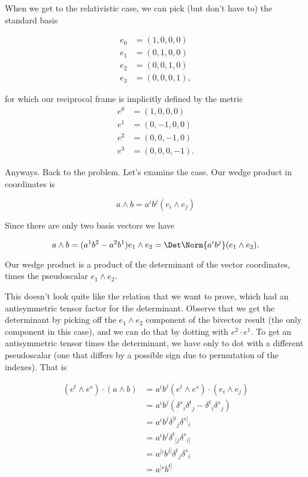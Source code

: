 When we get to the relativistic case, we can pick (but don't have to) the standard basis

\begin{align}\label{eqn:relElectroDynProblemSet3:330}
e_0 &= (1, 0, 0, 0) \\
e_1 &= (0, 1, 0, 0) \\
e_2 &= (0, 0, 1, 0) \\
e_3 &= (0, 0, 0, 1),
\end{align}

for which our reciprocal frame is implicitly defined by the metric
\begin{align}\label{eqn:relElectroDynProblemSet3:350}
e^0 &= (1, 0, 0, 0) \\
e^1 &= (0, -1, 0, 0) \\
e^2 &= (0, 0, -1, 0) \\
e^3 &= (0, 0, 0, -1).
\end{align}

Anyways.  Back to the problem.  Let's examine the  case.  Our wedge product in coordinates is

\begin{equation}\label{eqn:relElectroDynProblemSet3:370}
a \wedge b
=
a^i b^j (e_i \wedge e_j)
\end{equation}

Since there are only two basis vectors we have

\begin{equation}\label{eqn:relElectroDynProblemSet3:390}
a \wedge b
=
(a^1 b^2 - a^2 b^1) e_1 \wedge e_2 = \Det \Norm{a^i b^j} (e_1 \wedge e_2).
\end{equation}

Our wedge product is a product of the determinant of the vector coordinates, times the  pseudoscalar $e_1 \wedge e_2$.

This doesn't look quite like the  relation that we want to prove, which had an antisymmetric tensor factor for the determinant.  Observe that we get the determinant by picking off the $e_1 \wedge e_2$ component of the bivector result (the only component in this case), and we can do that by dotting with $e^2 \cdot e^1$.  To get an antisymmetric tensor times the determinant, we have only to dot with a different pseudoscalar (one that differs by a possible sign due to permutation of the indexes).  That is

\begin{align*}
(e^t \wedge e^s) \cdot (a \wedge b)
&=
a^i b^j (e^t \wedge e^s) \cdot (e_i \wedge e_j) \\
&=
a^i b^j
\left( {\delta^{s}}_i {\delta^{t}}_j
-{\delta^{t}}_i {\delta^{s}}_j  \right) \\
&=
a^i b^j
{\delta^{[t}}_j {\delta^{s]}}_i \\
&=
a^i b^j
{\delta^{t}}_{[j} {\delta^{s}}_{i]} \\
&=
a^{[i} b^{j]}
{\delta^{t}}_{j} {\delta^{s}}_{i} \\
&=
a^{[s} b^{t]}
\end{align*}


